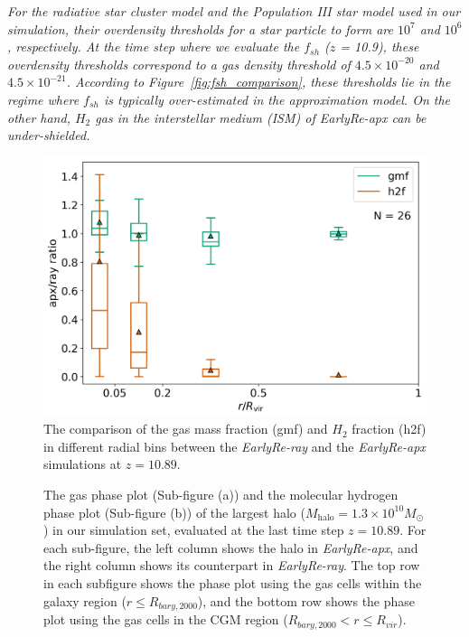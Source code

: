 \documentclass[linenumbers, twocolumn]{aastex631}
\begin{document}
\textit{For the radiative star cluster model and the Population III star model used in our simulation, their overdensity thresholds for a star particle to form are $10^{7}$ and $10^{6}$, respectively. At the time step where we evaluate the $f_{sh}$ ($z$ = 10.9), these overdensity thresholds correspond to a gas density threshold of $4.5\times 10^{-20}$ and $4.5\times 10^{-21}$. According to Figure~\ref{fig:fsh_comparison}, these thresholds lie in the regime where $f_{sh}$ is typically over-estimated in the approximation model. On the other hand, $H_{2}$ gas in the interstellar medium (ISM) of \textit{EarlyRe-apx} can be under-shielded.} 

\begin{figure}
	\centering
	\includegraphics[width=0.95\columnwidth]{EarlyRe/gmf_h2f_radialprofile_comparison.png}
	\caption{The comparison of the gas mass fraction (gmf) and $H_{2}$ fraction (h2f) in different radial bins between the \textit{EarlyRe-ray} and the \textit{EarlyRe-apx} simulations at $z = 10.89$.}
	\label{fig:gmf_h2f_radialprofile}
\end{figure}

\begin{figure}
    \caption{The gas phase plot (Sub-figure (a)) and the molecular hydrogen phase plot (Sub-figure (b)) of the largest halo ($M_{\mathrm{halo}} = 1.3\times10^{10} M_\odot$) in our simulation set, evaluated at the last time step $z = 10.89$. For each sub-figure, the left column shows the halo in \textit{EarlyRe-apx}, and the right column shows its counterpart in \textit{EarlyRe-ray}. The top row in each subfigure shows the phase plot using the gas cells within the galaxy region ($r \leq R_{bary,2000}$), and the bottom row shows the phase plot using the gas cells in the CGM region ($R_{bary,2000} < r \leq R_{vir}$).} 
    \label{fig:phaseplot_Halo0-0}
\end{figure}
\end{document}

